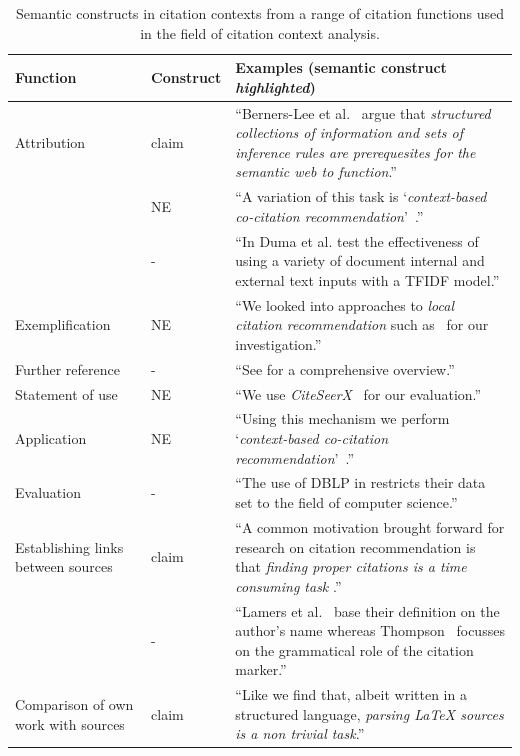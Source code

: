 \begin{table}[]
\centering
    \caption{Semantic constructs in citation contexts from a range of citation functions used in the field of citation context analysis.}
    \label{tab:citfunctions}
\begin{center}
    \begin{tabular}{m{2.7cm}lm{8.5cm}}
    \toprule
    Function & Construct & Examples (semantic construct \emph{highlighted})\\
    \midrule
    Attribution & claim & ``Berners-Lee et al.~\cite{Berners-Lee2001} argue that \emph{structured collections of information and sets of inference rules are prerequesites for the semantic web to function}.'' \\\noalign{\smallskip}
    \  & NE & ``A variation of this task is `\emph{context-based co-citation recommendation}'~\cite{Kobayashi2018}.'' \\\noalign{\smallskip}
    \  & - & ``In \cite{Duma2014} Duma et al. test the effectiveness of using a variety of document internal and external text inputs with a TFIDF model.'' \\\noalign{\medskip}
    Exemplification & NE & ``We looked into approaches to \emph{local citation recommendation} such as~\cite{He2010,Huang2014,Huang2015,Duma2014,Duma2016,Ebesu2017,Kobayashi2018,Jeong2019} for our investigation.'' \\\noalign{\medskip}
    Further reference & - & ``See \cite{Niklaus2018} for a comprehensive overview.'' \\\noalign{\medskip}
    Statement of use & NE & ``We use \emph{CiteSeerX}~\cite{Caragea2014} for our evaluation.'' \\\noalign{\medskip}
    Application & NE & ``Using this mechanism we perform `\emph{context-based co-citation recommendation}'~\cite{Kobayashi2018}.'' \\\noalign{\medskip}
    Evaluation & - & ``The use of DBLP in \cite{Faerber2018} restricts their data set to the field of computer science.'' \\\noalign{\medskip}
    Establishing links between sources& claim & ``A common motivation brought forward for research on citation recommendation is that \emph{finding proper citations is a time consuming task} \cite{He2010,He2011,Ebesu2017,Kobayashi2018}.'' \\\noalign{\smallskip}
    \  & - & ``Lamers et al.~\cite{Lamers2018} base their definition on the author's name whereas Thompson~\cite{Thompson2001} focusses on the grammatical role of the citation marker.'' \\\noalign{\medskip}
    Comparison of own work with sources& claim & ``Like \cite{Faerber2018} we find that, albeit written in a structured language, \emph{parsing \LaTeX{} sources is a non trivial task}.'' \\
    \bottomrule
    \end{tabular}
\end{center}
\end{table}

